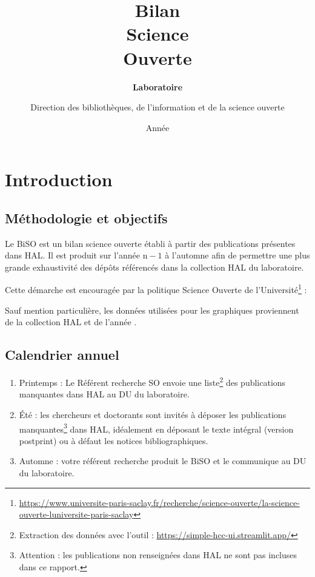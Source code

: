 \documentclass[french, 11pt]{dibiso/biso}
\title{Bilan \\ Science \\ Ouverte}
\author{Direction des bibliothèques, de l'information et de la science ouverte}
\date{Année \reportyear}
\subtitle{\textbf{Laboratoire \labacronym} \\
  \medskip
  \labfullname
}
\begin{document}
\renewcommand{\arraystretch}{2}


\maketitle

\tableofcontents

\pagebreak



\section{Introduction}


\subsection*{Méthodologie et objectifs}

Le BiSO est un bilan science ouverte établi à partir des publications présentes dans HAL. Il est produit sur l'année $\mathrm{n} - 1$ à l'automne afin de permettre une plus grande exhaustivité des dépôts référencés dans la collection HAL du laboratoire.

Cette démarche est encouragée par la politique Science Ouverte de l'Université\footnote{\url{https://www.universite-paris-saclay.fr/recherche/science-ouverte/la-science-ouverte-luniversite-paris-saclay}} : \\

Sauf mention particulière, les données utilisées pour les graphiques proviennent de la collection HAL \texttt{\halcollectionid} et de l'année {\reportyear}.

\subsection*{Calendrier annuel}

\begin{enumerate}
  \item Printemps : Le Référent recherche SO envoie une liste\footnote{Extraction des données avec l'outil  : \url{https://simple-hcc-ui.streamlit.app/}} des publications manquantes dans HAL au DU du laboratoire.
  \item Été : les chercheurs et doctorants sont invités à déposer les publications manquantes\footnote{Attention : les publications non renseignées dans HAL ne sont pas incluses dans ce rapport.} dans HAL, idéalement en déposant le texte intégral (version postprint) ou à défaut les notices bibliographiques.
  \item Automne : votre référent recherche produit le BiSO et le communique au DU du laboratoire.
\end{enumerate}
\end{document}

